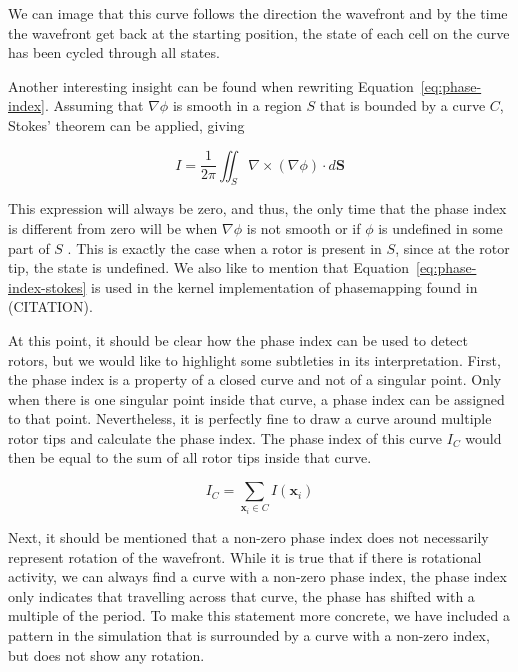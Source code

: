 \documentclass[twocolumn]{article}
\begin{document}

We can image that this curve follows the direction the wavefront
and by the time the wavefront get back at the starting position,
the state of each cell on the curve has been cycled through all states.

Another interesting insight can be found when rewriting Equation~\ref{eq:phase-index}.
Assuming that $\nabla\phi$ is smooth in a region $S$ that is bounded by a curve $C$,
Stokes' theorem can be applied, giving

\begin{equation}
  I = \frac{1}{2\pi} \iint_S \nabla \times (\nabla \phi) \cdot d\bm{S}
  \label{eq:phase-index-stokes}
\end{equation}

\noindent This expression will always be zero,
and thus, the only time that the phase index is different from zero will be when
$\nabla \phi$ is not smooth or if $\phi$ is undefined in some part of $S$ \autocite{herlin2012reconstruction}.
This is exactly the case when a rotor is present in $S$,
since at the rotor tip, the state is undefined.
We also like to mention that Equation~\ref{eq:phase-index-stokes}
is used in the kernel implementation of phasemapping found in (CITATION).

At this point, it should be clear how the phase index can be used to detect rotors,
but we would like to highlight some subtleties in its interpretation.
First, the phase index is a property of a closed curve
and not of a singular point.
Only when there is one singular point inside that curve,
a phase index can be assigned to that point.
Nevertheless, it is perfectly fine to draw a curve around multiple rotor tips
and calculate the phase index.
The phase index of this curve $I_C$ would then be equal to the sum of all rotor tips inside that curve.

\begin{equation}
  I_C = \sum_{\bm{x}_i\in C} I(\bm{x}_i)
  \label{eq:index-curve}
\end{equation}

Next, it should be mentioned that a non-zero phase index does not necessarily represent rotation of the wavefront.
While it is true that if there is rotational activity,
we can always find a curve with a non-zero phase index,
the phase index only indicates that travelling across that curve,
the phase has shifted with a multiple of the period.
To make this statement more concrete,
we have included a pattern in the simulation that is surrounded by a curve with a non-zero index,
but does not show any rotation.
\end{document}
